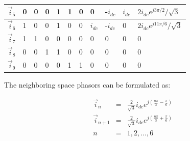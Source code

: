 \begin{table}[]
\begin{tabular}{|l|l|l|l|l|l|l|l|l|l|l|}
    $\vec{i}_5$                                                                           & 0          & 0          & 0          & 1          & 1          & 0          & 0                     & -$i_{dc}$                  & $i_{dc}$                  & $2i_{dc}e^{j3\pi/2}/\sqrt{3}$                                                                                           \\ \hline
    $\vec{i}_6$                                                                            & 1          & 0          & 0          & 1          & 0          & 0          & $i_{dc}$                   & -$i_{dc}$                  & 0                    & $2i_{dc}e^{j11\pi/6}/\sqrt{3}$                                                                                           \\ \hline
    $\vec{i}_7$                                                                            & 1          & 1          & 0          & 0          & 0          & 0          & 0                     & 0                     & 0                    & 0                                                                                             \\ \hline
    $\vec{i}_8$                                                                            & 0          & 0          & 1          & 1          & 0          & 0          & 0                     & 0                     & 0                    & 0                                                                                             \\ \hline
    $\vec{i}_9$                                                                            & 0          & 0          & 0          & 0          & 1          & 1          & 0                     & 0                     & 0                    & 0                                                                                             \\ \hline
    \end{tabular}
        \label{EMPC:tbl:fundamental_vect}

\end{table}

    The neighboring space phasors can be formulated as:

    \begin{equation}
        \begin{array}{rcl}
            \vec{i}_n&=&\frac{2}{\sqrt{3}}i_{dc}e^{j(\frac{n\pi}{3}-\frac{\pi}{6})}\\
            \vec{i}_{n+1}&=&\frac{2}{\sqrt{3}}i_{dc}e^{j(\frac{n\pi}{3}+\frac{\pi}{6})}\\
            n&=&1,2,\dots,6
        \end{array}
        \label{EMPC:equ:neighbor}
    \end{equation}

